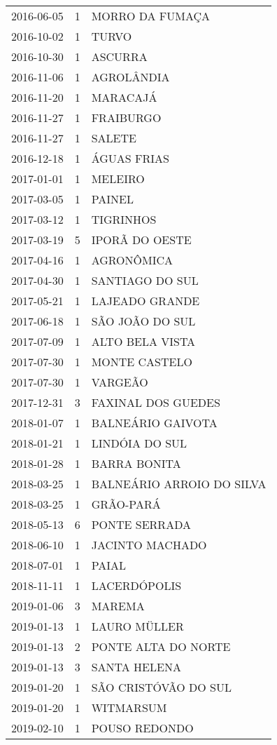 \begin{longtable}[htbp]{ccl}
2016-06-05 & 1 & MORRO DA FUMAÇA \\
2016-10-02 & 1 & TURVO \\
2016-10-30 & 1 & ASCURRA \\
2016-11-06 & 1 & AGROLÂNDIA \\
2016-11-20 & 1 & MARACAJÁ \\
2016-11-27 & 1 & FRAIBURGO \\
2016-11-27 & 1 & SALETE \\
2016-12-18 & 1 & ÁGUAS FRIAS \\
2017-01-01 & 1 & MELEIRO \\
2017-03-05 & 1 & PAINEL \\
2017-03-12 & 1 & TIGRINHOS \\
2017-03-19 & 5 & IPORÃ DO OESTE \\
2017-04-16 & 1 & AGRONÔMICA \\
2017-04-30 & 1 & SANTIAGO DO SUL \\
2017-05-21 & 1 & LAJEADO GRANDE \\
2017-06-18 & 1 & SÃO JOÃO DO SUL \\
2017-07-09 & 1 & ALTO BELA VISTA \\
2017-07-30 & 1 & MONTE CASTELO \\
2017-07-30 & 1 & VARGEÃO \\
2017-12-31 & 3 & FAXINAL DOS GUEDES \\
2018-01-07 & 1 & BALNEÁRIO GAIVOTA \\
2018-01-21 & 1 & LINDÓIA DO SUL \\
2018-01-28 & 1 & BARRA BONITA \\
2018-03-25 & 1 & BALNEÁRIO ARROIO DO SILVA \\
2018-03-25 & 1 & GRÃO-PARÁ \\
2018-05-13 & 6 & PONTE SERRADA \\
2018-06-10 & 1 & JACINTO MACHADO \\
2018-07-01 & 1 & PAIAL \\
2018-11-11 & 1 & LACERDÓPOLIS \\
2019-01-06 & 3 & MAREMA \\
2019-01-13 & 1 & LAURO MÜLLER \\
2019-01-13 & 2 & PONTE ALTA DO NORTE \\
2019-01-13 & 3 & SANTA HELENA \\
2019-01-20 & 1 & SÃO CRISTÓVÃO DO SUL \\
2019-01-20 & 1 & WITMARSUM \\
2019-02-10 & 1 & POUSO REDONDO \\

\end{longtable}
